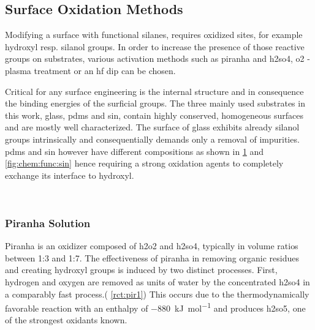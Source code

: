 \subsection{Surface Oxidation Methods}
Modifying a surface with functional silanes, requires oxidized sites, for example \gls{hydroxyl} resp. \gls{silanol} groups. In order to increase the presence of those reactive groups on substrates, various activation methods such as \gls{piranha} and \gls{h2so4}, \gls{o2} - plasma treatment or an \gls{hf} dip can be chosen.\cite{lit:chem:sin:etchingandchemical} 

Critical for any surface engineering is the internal structure and in consequence the binding energies of the surficial groups. The three mainly used substrates in this work, glass, \gls{pdms} and \gls{sin}, contain highly conserved, homogeneous surfaces and are mostly well characterized. The surface of glass exhibits already \gls{silanol} groups intrinsically and consequentially demands only a removal of impurities. \gls{pdms} and \gls{sin} however have different compositions as shown in \cref{fig:chem:func:substrate} and \cref{fig:chem:func:sin} hence requiring a strong oxidation agents to completely exchange its interface to \gls{hydroxyl}.\cite{lit:chem:binding:sin, lit:chem:binding:pdms, lit:chem:surface:pdms}
\begin{figure}[h!]
	\centering
	\\
	\vspace{\baselineskip}
	\label{fig:chem:func:substrate}
\end{figure}

\subsubsection{Piranha Solution}
Piranha is an oxidizer composed of \gls{h2o2} and \gls{h2so4}, typically in volume ratios between 1:3 and 1:7. The effectiveness of piranha in removing organic residues and creating \gls{hydroxyl} groups is induced by two distinct processes. First, hydrogen and oxygen are removed as units of water by the concentrated \gls{h2so4} in a comparably fast process.( \cref{rct:pir1}) This occurs due to the thermodynamically favorable reaction with an enthalpy of \SI{-880}{\kilo\joule\per\mole} and produces \gls{h2so5}, one of the strongest oxidants known.\cite{lit:chem:piranha}


